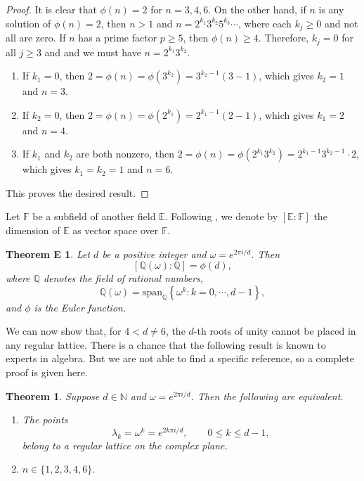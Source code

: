 \documentclass[reqno,11pt]{amsart}
\newtheorem{theorem}{Theorem}
\newtheorem*{theoreme*}{Theorem E}
\newcommand{\N}{\mathbb N}
\begin{document}
\begin{proof}
It is clear that $\phi(n)=2$ for $n=3, 4, 6$. On the other hand, if $n$
is any solution of $\phi(n)=2$, then $n>1$ and
$n=2^{k_{1}}3^{k_{2}}5^{k_{3}}\cdots$, where each $k_{j}\geq 0$ 
and not all are zero. If $n$ has a prime factor $p\geq 5$, then 
$\phi(n)\geq 4$. Therefore, $k_{j}=0$ for all $j\geq 3$ and and we
must have $n = 2^{k_{1}}3^{k_{2}}$.

\begin{enumerate}
\item[(a)] If $k_{1}=0$, then $2=\phi(n)=\phi(3^{k_2})=3^{k_2-1}(3-1)$,
which gives $k_{2}=1$ and $n=3$.
\item[(b)] If $k_{2}=0$, then $2=\phi(n)=\phi(2^{k_1})=2^{k_1-1}(2-1)$,
which gives $k_{1}=2$ and $n=4$.
\item[(c)] If $k_{1}$ and $k_{2}$ are both nonzero, then 
$2=\phi(n)=\phi(2^{k_{1}}3^{k_{2}})=2^{k_{1}-1}3^{k_{2}-1}\cdot 2$, 
which gives $k_{1}=k_{2}=1$ and $n=6$.
\end{enumerate}
This proves the desired result.
\end{proof}

Let $\mathbb{F}$ be a subfield of another field $\mathbb{E}$. Following
\cite[pp.223-224]{L2002}, we denote by $[\mathbb{E}:\mathbb{F}]$ the 
dimension of $\mathbb{E}$ as vector space over $\mathbb{F}$. 

\begin{theoreme*}\cite[Theorem 3.1, pp.278]{L2002}
Let $d$ be a positive integer and $\omega=e^{2\pi i/d}$. Then 
$$[\mathbb{Q}(\omega): \mathbb{Q}]=\phi(d),$$ 
where $\mathbb{Q}$ denotes the field of rational numbers, 
$$\mathbb{Q}(\omega)=\text{span}_{\mathbb{Q}}
\left\{\omega^k:k=0,\cdots,d-1\right\},$$ 
and $\phi$ is the Euler function.
\end{theoreme*}

We can now show that, for $4<d\not=6$, the $d$-th roots of unity
cannot be placed in any regular lattice. There is a chance that the 
following result is known to experts in algebra. But we are not
able to find a specific reference, so a complete proof is given here.

\begin{theorem}\label{t4}
Suppose $d\in\N$ and $\omega=e^{2\pi i/d}$. Then the
following are equivalent.
\begin{enumerate}
\item[(a)] The points
$$\lambda_k=\omega^k=e^{2k\pi i/d},\qquad 0\le k\le d-1,$$
belong to a regular lattice on the complex plane.
\item[(b)] $n\in\{1,2,3,4,6\}$.
\end{enumerate}
\end{theorem}
\end{document}
